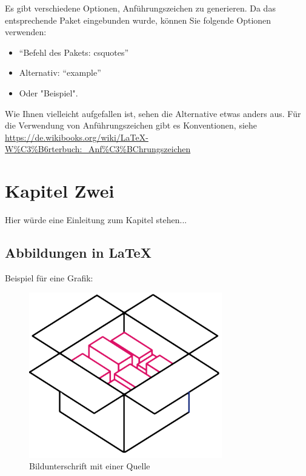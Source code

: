 Es gibt verschiedene Optionen, Anführungszeichen zu generieren. Da das entsprechende Paket eingebunden wurde, können Sie folgende Optionen verwenden:

\begin{itemize}
	\item \enquote{Befehl des Pakets: csquotes}
	\item Alternativ: ``example''
	\item Oder "Beispiel". 
\end{itemize}

Wie Ihnen vielleicht aufgefallen ist, sehen die Alternative etwas anders aus. Für die Verwendung von Anführungszeichen gibt es Konventionen, siehe \url{https://de.wikibooks.org/wiki/LaTeX-W%C3%B6rterbuch:_Anf%C3%BChrungszeichen}

\chapter{Kapitel Zwei}
Hier würde eine Einleitung zum Kapitel stehen... 

\section{Abbildungen in LaTeX}
\label{sec:abbildungen_in_latex}

Beispiel für eine Grafik:
\begin{figure}[!ht]
	\centering
		\includegraphics[width=0.75\textwidth]{images/MIBox.png}
	\caption{Bildunterschrift mit einer Quelle \citep{Autor2013}}
	\label{fig:box}
\end{figure}

